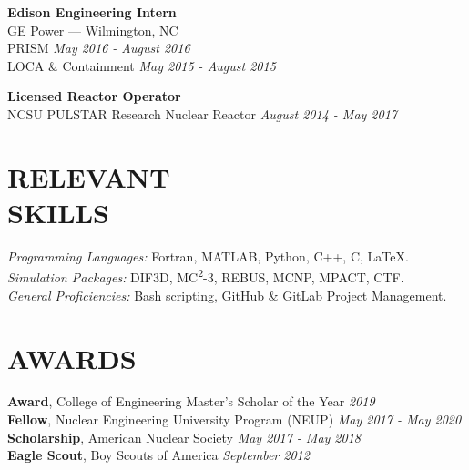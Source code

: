 \documentclass[margin, 10pt]{res}
\newcommand{\backwardspace}{-8pt}
\begin{document}
\begin{resume}
\vspace{\backwardspace}
\textbf{Edison Engineering Intern} \\
GE Power --- Wilmington, NC \\
PRISM \hfill \textit{May 2016 - August 2016}\\
LOCA \& Containment \hfill \textit{May 2015 - August 2015}

\vspace{\backwardspace}
\textbf{Licensed Reactor Operator} \\
NCSU PULSTAR Research Nuclear Reactor \hfill \textit{August 2014 - May 2017}


\section{RELEVANT \\ SKILLS}

{\sl Programming Languages:} Fortran, MATLAB, Python, C++, C, \LaTeX. \\
{\sl Simulation Packages:} DIF3D, MC\textsuperscript{2}-3, REBUS, MCNP, MPACT, 
  CTF. \\
{\sl General Proficiencies:} Bash scripting, GitHub \& GitLab Project 
  Management.

\section{AWARDS}
\textbf{Award}, College of Engineering Master's Scholar of the Year 
  \hfill \textit{2019} \\
\textbf{Fellow}, Nuclear Engineering University Program (NEUP) \hfill 
  \textit{May 2017 - May 2020} \\
\textbf{Scholarship}, American Nuclear Society \hfill 
  \textit{May 2017 - May 2018} \\
\textbf{Eagle Scout}, Boy Scouts of America \hfill 
  \textit{September 2012}

\end{resume}
\end{document}
